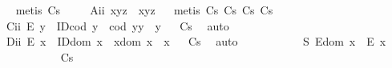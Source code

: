 \begin{isabellebody}
\isadelimproof
\ %
\endisadelimproof
%
\isatagproof
{}\isamarkupfalse%
\ {\isacharparenleft}metis\ Cs{\isacharparenright}%
\endisatagproof
{\isafoldproof}%
%
\isadelimproof
%
\endisadelimproof
\isanewline
\ \ \ \isamarkupfalse%
\ A\isactrlsub i\isactrlsub i{\isacharcolon}\ {\isachardoublequoteopen}x{\isasymcdot}{\isacharparenleft}y{\isasymcdot}z{\isacharparenright}\ {\isasymcong}\ {\isacharparenleft}x{\isasymcdot}y{\isacharparenright}{\isasymcdot}z{\isachardoublequoteclose}%
\isadelimproof
\ %
\endisadelimproof
%
\isatagproof
{}\isamarkupfalse%
\ {\isacharparenleft}metis\ Cs\ Cs\ Cs\ Cs{\isacharparenright}%
\endisatagproof
{\isafoldproof}%
%
\isadelimproof
%
\endisadelimproof
\isanewline
\ \ \ \isamarkupfalse%
\ C\isactrlsub i\isactrlsub i{\isacharcolon}\ {\isachardoublequoteopen}E\ y\ \isactrlbold {\isasymrightarrow}\ {\isacharparenleft}ID{\isacharparenleft}cod\ y{\isacharparenright}\ \isactrlbold {\isasymand}\ {\isacharparenleft}cod\ y{\isacharparenright}{\isasymcdot}y\ {\isasymcong}\ y{\isacharparenright}{\isachardoublequoteclose}%
\isadelimproof
\ %
\endisadelimproof
%
\isatagproof
{}\isamarkupfalse%
\ Cs\ \isamarkupfalse%
\ auto%
\endisatagproof
{\isafoldproof}%
%
\isadelimproof
%
\endisadelimproof
\isanewline
\ \ \ \isamarkupfalse%
\ D\isactrlsub i\isactrlsub i{\isacharcolon}\ {\isachardoublequoteopen}E\ x\ \isactrlbold {\isasymrightarrow}\ {\isacharparenleft}ID{\isacharparenleft}dom\ x{\isacharparenright}\ \isactrlbold {\isasymand}\ x{\isasymcdot}{\isacharparenleft}dom\ x{\isacharparenright}\ {\isasymcong}\ x{\isacharparenright}{\isachardoublequoteclose}%
\isadelimproof
\ %
\endisadelimproof
%
\isatagproof
{}\isamarkupfalse%
\ Cs\ \isamarkupfalse%
\ auto\isanewline
\isanewline
\ \ \ %
%
\endisatagproof
{\isafoldproof}%
%
\isadelimproof
%
\endisadelimproof
\isanewline
\ \ \isanewline
\ \ \ \isamarkupfalse%
\ S{}{\isacharcolon}\ {\isachardoublequoteopen}E{\isacharparenleft}dom\ x{\isacharparenright}\ \isactrlbold {\isasymrightarrow}\ E\ x{\isachardoublequoteclose}%
\isadelimproof
\ \ \ \ \ \ \ \ \ %
\endisadelimproof
%
\isatagproof
{}\isamarkupfalse%
\ Cs\ \isamarkupfalse%

\end{isabellebody}
